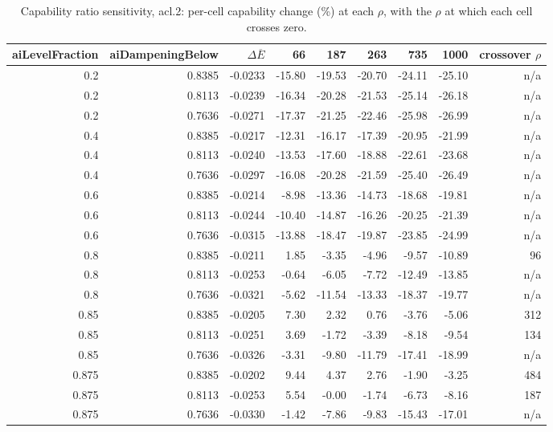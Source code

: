 \begin{table}[htbp]
  \centering
  \caption{Capability ratio sensitivity, acl.2: per-cell capability change (\%) at each $\rho$, with the $\rho$ at which each cell crosses zero.}
  \label{tab:rho-acl-2-cells}
  \begin{tabular}{r r r r r r r r r}
    \toprule
    aiLevelFraction & aiDampeningBelow & $\Delta\overline{E}$ & 66 & 187 & 263 & 735 & 1000 & crossover $\rho$ \\
    \midrule
    0.2 & 0.8385 & -0.0233 & -15.80 & -19.53 & -20.70 & -24.11 & -25.10 & n/a \\
    0.2 & 0.8113 & -0.0239 & -16.34 & -20.28 & -21.53 & -25.14 & -26.18 & n/a \\
    0.2 & 0.7636 & -0.0271 & -17.37 & -21.25 & -22.46 & -25.98 & -26.99 & n/a \\
    0.4 & 0.8385 & -0.0217 & -12.31 & -16.17 & -17.39 & -20.95 & -21.99 & n/a \\
    0.4 & 0.8113 & -0.0240 & -13.53 & -17.60 & -18.88 & -22.61 & -23.68 & n/a \\
    0.4 & 0.7636 & -0.0297 & -16.08 & -20.28 & -21.59 & -25.40 & -26.49 & n/a \\
    0.6 & 0.8385 & -0.0214 & -8.98 & -13.36 & -14.73 & -18.68 & -19.81 & n/a \\
    0.6 & 0.8113 & -0.0244 & -10.40 & -14.87 & -16.26 & -20.25 & -21.39 & n/a \\
    0.6 & 0.7636 & -0.0315 & -13.88 & -18.47 & -19.87 & -23.85 & -24.99 & n/a \\
    0.8 & 0.8385 & -0.0211 & 1.85 & -3.35 & -4.96 & -9.57 & -10.89 & 96 \\
    0.8 & 0.8113 & -0.0253 & -0.64 & -6.05 & -7.72 & -12.49 & -13.85 & n/a \\
    0.8 & 0.7636 & -0.0321 & -5.62 & -11.54 & -13.33 & -18.37 & -19.77 & n/a \\
    0.85 & 0.8385 & -0.0205 & 7.30 & 2.32 & 0.76 & -3.76 & -5.06 & 312 \\
    0.85 & 0.8113 & -0.0251 & 3.69 & -1.72 & -3.39 & -8.18 & -9.54 & 134 \\
    0.85 & 0.7636 & -0.0326 & -3.31 & -9.80 & -11.79 & -17.41 & -18.99 & n/a \\
    0.875 & 0.8385 & -0.0202 & 9.44 & 4.37 & 2.76 & -1.90 & -3.25 & 484 \\
    0.875 & 0.8113 & -0.0253 & 5.54 & -0.00 & -1.74 & -6.73 & -8.16 & 187 \\
    0.875 & 0.7636 & -0.0330 & -1.42 & -7.86 & -9.83 & -15.43 & -17.01 & n/a \\
    \bottomrule
  \end{tabular}
\end{table}
